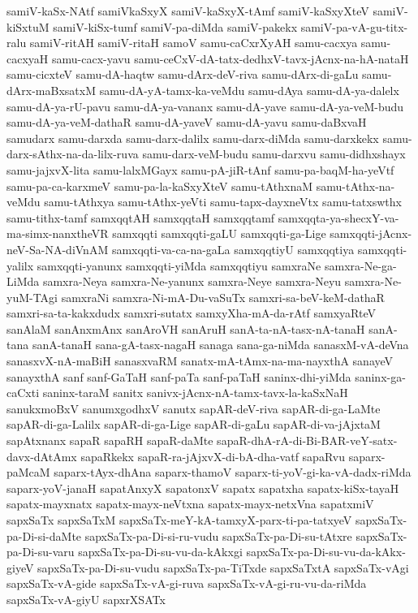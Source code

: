 {samiV-kaSx-NAtf
samiVkaSxyX
samiV-kaSxyX-tAmf
samiV-kaSxyXteV
samiV-kiSxtuM
samiV-kiSx-tumf
samiV-pa-diMda
samiV-pakekx
samiV-pa-vA-gu-titx-ralu
samiV-ritAH
samiV-ritaH
samoV
samu-caCxrXyAH
samu-cacxya
samu-cacxyaH
samu-cacx-yavu
samu-ceCxV-dA-tatx-dedhxV-tavx-jAcnx-na-hA-nataH
samu-cicxteV
samu-dA-haqtw
samu-dArx-deV-riva
samu-dArx-di-gaLu
samu-dArx-maBxsatxM
samu-dA-yA-tamx-ka-veMdu
samu-dAya
samu-dA-ya-dalelx
samu-dA-ya-rU-pavu
samu-dA-ya-vananx
samu-dA-yave
samu-dA-ya-veM-budu
samu-dA-ya-veM-dathaR
samu-dA-yaveV
samu-dA-yavu
samu-daBxvaH
samudarx
samu-darxda
samu-darx-dalilx
samu-darx-diMda
samu-darxkekx
samu-darx-sAthx-na-da-lilx-ruva
samu-darx-veM-budu
samu-darxvu
samu-didhxshayx
samu-jajxvX-lita
samu-lalxMGayx
samu-pA-jiR-tAnf
samu-pa-baqM-ha-yeVtf
samu-pa-ca-karxmeV
samu-pa-la-kaSxyXteV
samu-tAthxnaM
samu-tAthx-na-veMdu
samu-tAthxya
samu-tAthx-yeVti
samu-tapx-dayxneVtx
samu-tatxswthx
samu-tithx-tamf
samxqqtAH
samxqqtaH
samxqqtamf
samxqqta-ya-shecxY-va-ma-simx-nanxtheVR
samxqqti
samxqqti-gaLU
samxqqti-ga-Lige
samxqqti-jAcnx-neV-Sa-NA-diVnAM
samxqqti-va-ca-na-gaLa
samxqqtiyU
samxqqtiya
samxqqti-yalilx
samxqqti-yanunx
samxqqti-yiMda
samxqqtiyu
samxraNe
samxra-Ne-ga-LiMda
samxra-Neya
samxra-Ne-yanunx
samxra-Neye
samxra-Neyu
samxra-Ne-yuM-TAgi
samxraNi
samxra-Ni-mA-Du-vaSuTx
samxri-sa-beV-keM-dathaR
samxri-sa-ta-kakxdudx
samxri-sutatx
samxyXha-mA-da-rAtf
samxyaRteV
sanAlaM
sanAnxmAnx
sanAroVH
sanAruH
sanA-ta-nA-tasx-nA-tanaH
sanA-tana
sanA-tanaH
sana-gA-tasx-nagaH
sanaga
sana-ga-niMda
sanasxM-vA-deVna
sanasxvX-nA-maBiH
sanasxvaRM
sanatx-mA-tAmx-na-ma-nayxthA
sanayeV
sanayxthA
sanf
sanf-GaTaH
sanf-paTa
sanf-paTaH
saninx-dhi-yiMda
saninx-ga-caCxti
saninx-taraM
sanitx
sanivx-jAcnx-nA-tamx-tavx-la-kaSxNaH
sanukxmoBxV
sanumxgodhxV
sanutx
sapAR-deV-riva
sapAR-di-ga-LaMte
sapAR-di-ga-Lalilx
sapAR-di-ga-Lige
sapAR-di-gaLu
sapAR-di-va-jAjxtaM
sapAtxnanx
sapaR
sapaRH
sapaR-daMte
sapaR-dhA-rA-di-Bi-BAR-veY-satx-davx-dAtAmx
sapaRkekx
sapaR-ra-jAjxvX-di-bA-dha-vatf
sapaRvu
saparx-paMcaM
saparx-tAyx-dhAna
saparx-thamoV
saparx-ti-yoV-gi-ka-vA-dadx-riMda
saparx-yoV-janaH
sapatAnxyX
sapatonxV
sapatx
sapatxha
sapatx-kiSx-tayaH
sapatx-mayxnatx
sapatx-mayx-neVtxna
sapatx-mayx-netxVna
sapatxmiV
sapxSaTx
sapxSaTxM
sapxSaTx-meY-kA-tamxyX-parx-ti-pa-tatxyeV
sapxSaTx-pa-Di-si-daMte
sapxSaTx-pa-Di-si-ru-vudu
sapxSaTx-pa-Di-su-tAtxre
sapxSaTx-pa-Di-su-varu
sapxSaTx-pa-Di-su-vu-da-kAkxgi
sapxSaTx-pa-Di-su-vu-da-kAkx-giyeV
sapxSaTx-pa-Di-su-vudu
sapxSaTx-pa-TiTxde
sapxSaTxtA
sapxSaTx-vAgi
sapxSaTx-vA-gide
sapxSaTx-vA-gi-ruva
sapxSaTx-vA-gi-ru-vu-da-riMda
sapxSaTx-vA-giyU
sapxrXSATx
}
